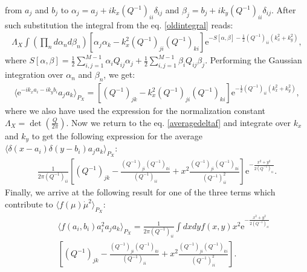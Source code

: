 \documentclass{article}
\begin{document}
from $a_{j}$ and $b_{j}$ to $\alpha_{j} = a_{j}+ik_{x}(Q^{-1})_{ii}\delta_{ij}$ and $\beta_{j} = b_{j}+ik_{y}(Q^{-1})_{ii}\delta_{ij}$. After such substitution the integral from the eq$.$ \eqref{oldintegral} reads: 
\begin{eqnarray}
    \Lambda_{X}\int \left(\prod_{n} d\alpha_{n}d\beta_{n}\right) \left[\alpha_{j}\alpha_{k} - k_{x}^{2}(Q^{-1})_{ji}(Q^{-1})_{ki}\right]\textrm{e}^{-S[\alpha,\beta] - \frac{1}{2}(Q^{-1})_{ii}(k_{x}^{2}+k_{y}^{2})},
\end{eqnarray}
where $S[\alpha,\beta] = \frac{1}{2}\sum_{i,j=1}^{M-1}\alpha_{i}Q_{ij}\alpha_{j}+\frac{1}{2}\sum_{i,j=1}^{M-1}\beta_{i}Q_{ij}\beta_{j}$. Performing the Gaussian integration over $\alpha_{n}$ and $\beta_{n}$, we get: 
\begin{eqnarray}
    \langle \textrm{e}^{-ik_{x}a_{i}-ik_{y}b_{i}}a_{j}a_{k} \rangle_{P_{X}} = \left[(Q^{-1})_{jk}-k_{x}^{2}(Q^{-1})_{ji}(Q^{-1})_{ki}\right]\textrm{e}^{-\frac{1}{2}(Q^{-1})_{ii}(k_{x}^{2}+k_{y}^{2})},
\end{eqnarray}
where we also have used the expression for the normalization constant $\Lambda_{X} = \det
\left(\frac{Q}{2\pi}\right)$. Now we return to the eq$.$ \eqref{averagedeltaf} and integrate over $k_{x}$ and $k_{y}$ to get the following expression for the average $\langle \delta(x-a_{i})\delta(y-b_{i})a_{j}a_{k}\rangle_{P_{X}}$:
\begin{eqnarray}
    \frac{1}{2\pi(Q^{-1})_{ii}}\left[(Q^{-1})_{jk}-\frac{(Q^{-1})_{ji}(Q^{-1})_{ki}}{(Q^{-1})_{ii}}+x^{2}\frac{(Q^{-1})_{ji}(Q^{-1})_{ki}}{(Q^{-1})_{ii}^{2}}\right]\textrm{e}^{-\frac{x^{2}+y^{2}}{2(Q^{-1})_{ii}}}.
\end{eqnarray}
Finally, we arrive at the following result for one of the three terms which contribute to $\langle f(\mu)\dot{\mu}^{2} \rangle_{P_{X}}$:
\begin{eqnarray}\label{firsttermfmu}
    &&\langle f(a_{i},b_{i})a_{i}^{2}a_{j}a_{k}\rangle_{P_{X}} = \frac{1}{2\pi(Q^{-1})_{ii}}\int dxdy f(x,y)x^{2}\textrm{e}^{-\frac{x^{2}+y^{2}}{2(Q^{-1})_{ii}}} \nonumber\\
    &&\left[(Q^{-1})_{jk}-\frac{(Q^{-1})_{ji}(Q^{-1})_{ki}}{(Q^{-1})_{ii}}+x^{2}\frac{(Q^{-1})_{ji}(Q^{-1})_{ki}}{(Q^{-1})_{ii}^{2}}\right].
\end{eqnarray}
\end{document}
